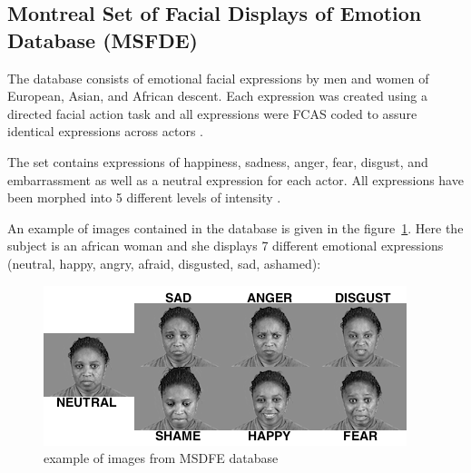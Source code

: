 \subsection{Montreal Set of Facial Displays of Emotion Database (MSFDE)}

\vspace{\baselineskip}
\noindent The database consists of emotional facial expressions by men and women of European, Asian, and African descent. Each expression was created using a directed facial action task and all expressions were FCAS coded to assure identical expressions across actors \cite{MSFDE}.
\newline

\noindent The set contains expressions of happiness, sadness, anger, fear, disgust, and embarrassment as well as a neutral expression for each actor. All expressions have been morphed into 5 different levels of intensity \cite{MSFDE}.
\newline

\noindent An example of images contained in the database is given in the figure~\ref{msfde_7facialexpressions}. Here the subject is an african woman and she displays 7 different emotional expressions (neutral, happy, angry, afraid, disgusted, sad, ashamed): 
\newline

\begin{figure}[!h]
\begin{center}
\noindent \includegraphics[scale=0.9]{figures/msfde_7facialexpressions} 
\newline
\caption{example of images from MSDFE database}
\label{msfde_7facialexpressions}
\end{center} 
\end{figure}






